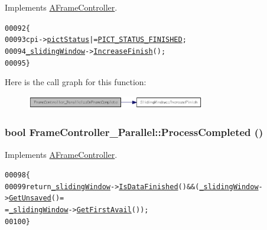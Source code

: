 Implements \hyperlink{class_a_frame_controller_afd4834463eebfc33536fed009bfb966c}{AFrameController}.





\begin{footnotesize}\begin{alltt}
00092 \{
00093         cpi->\hyperlink{struct_coding_pict_info_a41498e5ba764405481005e6569d7f728}{pictStatus} |= \hyperlink{_picture_info_8h_a170d5962358e97425e08d5646653494b}{PICT_STATUS_FINISHED};
00094         \hyperlink{class_a_frame_controller_aca7790494d5c5d114171269ddaabd568}{_slidingWindow}->\hyperlink{class_sliding_window_a8f303bc211297021f20e09dced119207}{IncreaseFinish}();
00095 \}
\end{alltt}\end{footnotesize}




Here is the call graph for this function:\nopagebreak
\begin{figure}[H]
\begin{center}
\leavevmode
\includegraphics[width=221pt]{class_frame_controller___parallel_a26429e70ddf3aa68cc2d28000a4935e1_cgraph}
\end{center}
\end{figure}


\hypertarget{class_frame_controller___parallel_ac778eb523c6725a9e4da4e4239a88b2a}{
\subsubsection[{ProcessCompleted}]{\setlength{\rightskip}{0pt plus 5cm}bool FrameController\_\-Parallel::ProcessCompleted ()}}
\label{class_frame_controller___parallel_ac778eb523c6725a9e4da4e4239a88b2a}


Implements \hyperlink{class_a_frame_controller_a92ba4b7f8c0c84fff8be7203fae5221d}{AFrameController}.





\begin{footnotesize}\begin{alltt}
00098 \{
00099         \textcolor{keywordflow}{return} \hyperlink{class_a_frame_controller_aca7790494d5c5d114171269ddaabd568}{_slidingWindow}->\hyperlink{class_sliding_window_afd67521d283b68f9fbc769ee9c0ba4b4}{IsDataFinished}() && (\hyperlink{class_a_frame_controller_aca7790494d5c5d114171269ddaabd568}{_slidingWindow}->\hyperlink{class_sliding_window_a3df64e20282ce10a45c4c3f3011e536d}{GetUnsaved}()=
      =\hyperlink{class_a_frame_controller_aca7790494d5c5d114171269ddaabd568}{_slidingWindow}->\hyperlink{class_sliding_window_a2128091c76b407cd0e244759ba5a2846}{GetFirstAvail}());
00100 \}
\end{alltt}\end{footnotesize}




